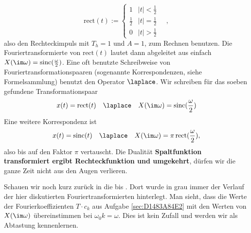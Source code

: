 \begin{Loesung}
\begin{equation}
\text{rect}(t) := \begin{cases} 1 & |t| < \frac{1}{2} \\ \frac{1}{2} & |t| = \frac{1}{2} \\ 0 & |t| > \frac{1}{2} \end{cases}\quad,
\end{equation}
also den Rechteckimpuls mit $T_h=1$ und $A=1$, zum Rechnen benutzen.
%
Die Fouriertransformierte von $\text{rect}(t)$ lautet dann abgeleitet aus
 einfach
$X(\im \omega) = \mathrm{sinc}(\frac{\omega}{2})$.
%
Eine oft benutzte Schreibweise von Fouriertransformationspaaren (sogenannte
Korrespondenzen, siehe Formelsammlung) benutzt den Operator $\laplace$.
%
Wir schreiben für das soeben gefundene Transformationspaar
\begin{equation}
x(t) = \text{rect}(t) \quad \laplace \quad X(\im \omega) = \mathrm{sinc}(\frac{\omega}{2})
\end{equation}
%
Eine weitere Korrespondenz ist
\begin{equation}
x(t) = \text{sinc}(t) \quad \laplace \quad X(\im \omega) = \pi \, \mathrm{rect}(\frac{\omega}{2}),
\end{equation}
also bis auf den Faktor $\pi$ vertauscht.
%
Die Dualität \textbf{Spaltfunktion transformiert ergibt Rechteckfunktion und umgekehrt},
dürfen wir die ganze Zeit nicht aus den Augen verlieren.

Schauen wir noch kurz zurück in die  bis .
Dort wurde in grau immer der Verlauf der hier diskutierten Fouriertransformierten
hinterlegt. Man sieht, dass die Werte der Fourierkoeffizienten $T \cdot c_k$
 aus Aufgabe \ref{sec:D1483A84E2}
mit den Werten von $X(\im\omega)$  übereinstimmen bei
$\omega_0 k = \omega$. Dies ist kein Zufall und werden wir als Abtastung
kennenlernen.



\end{Loesung}

